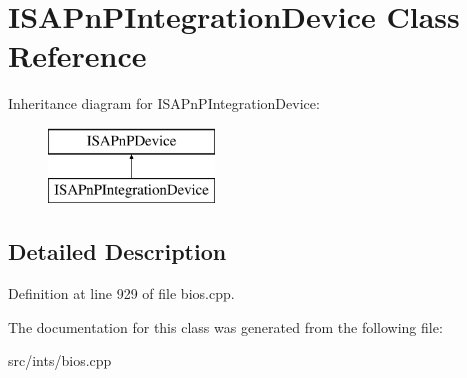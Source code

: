 \hypertarget{classISAPnPIntegrationDevice}{\section{I\-S\-A\-Pn\-P\-Integration\-Device Class Reference}
\label{classISAPnPIntegrationDevice}
}
Inheritance diagram for I\-S\-A\-Pn\-P\-Integration\-Device\-:\begin{figure}[H]
\begin{center}
\leavevmode
\includegraphics[height=2.000000cm]{classISAPnPIntegrationDevice}
\end{center}
\end{figure}


\subsection{Detailed Description}


Definition at line 929 of file bios.\-cpp.



The documentation for this class was generated from the following file\-:\begin{DoxyCompactItemize}
\item 
src/ints/bios.\-cpp\end{DoxyCompactItemize}
